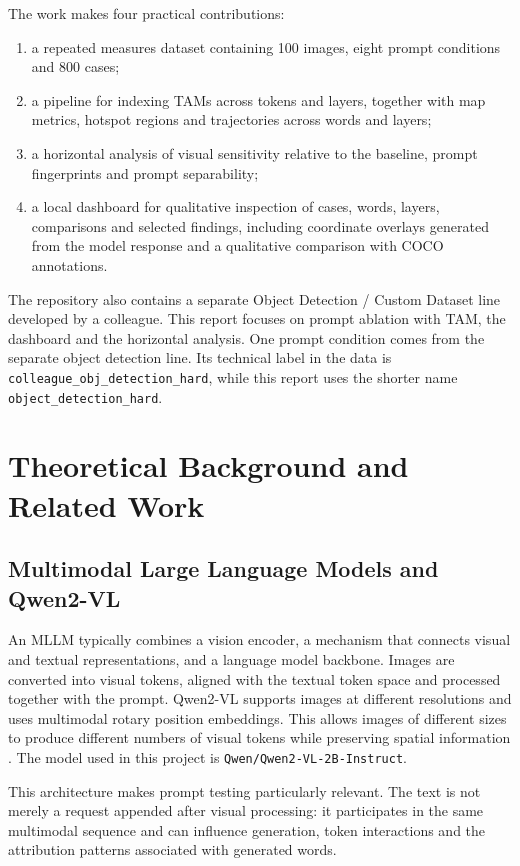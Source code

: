 \documentclass[11pt,a4paper]{article}
\newcommand{\code}[1]{\texttt{\small #1}}
\begin{document}
The work makes four practical contributions:

\begin{enumerate}
  \item a repeated measures dataset containing 100 images, eight prompt conditions and 800 cases;
  \item a pipeline for indexing TAMs across tokens and layers, together with map metrics, hotspot regions and trajectories across words and layers;
  \item a horizontal analysis of visual sensitivity relative to the baseline, prompt fingerprints and prompt separability;
  \item a local dashboard for qualitative inspection of cases, words, layers, comparisons and selected findings, including coordinate overlays generated from the model response and a qualitative comparison with COCO annotations.
\end{enumerate}

The repository also contains a separate Object Detection / Custom Dataset line developed by a colleague. This report focuses on prompt ablation with TAM, the dashboard and the horizontal analysis. One prompt condition comes from the separate object detection line. Its technical label in the data is \code{colleague\_obj\_detection\_hard}, while this report uses the shorter name \code{object\_detection\_hard}.

\section{Theoretical Background and Related Work}

\subsection{Multimodal Large Language Models and Qwen2-VL}

An MLLM typically combines a vision encoder, a mechanism that connects visual and textual representations, and a language model backbone. Images are converted into visual tokens, aligned with the textual token space and processed together with the prompt. Qwen2-VL supports images at different resolutions and uses multimodal rotary position embeddings. This allows images of different sizes to produce different numbers of visual tokens while preserving spatial information \cite{wang2024qwen2vl}. The model used in this project is \code{Qwen/Qwen2-VL-2B-Instruct}.

This architecture makes prompt testing particularly relevant. The text is not merely a request appended after visual processing: it participates in the same multimodal sequence and can influence generation, token interactions and the attribution patterns associated with generated words.
\end{document}
